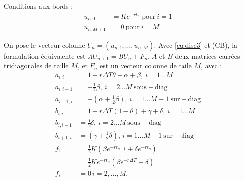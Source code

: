 \documentclass[a4paper, 11pt]{article}
\renewcommand{\(}{\left (}
\renewcommand{\)}{\right )}
\newcommand{\uni}[2]{u_{{#1},{#2}}}
\begin{document}
Conditions aux bords :
\begin{align*}
  \uni{n}{0}   & = Ke^{-rt_n} \mathrm{\ pour\ } i = 1 \\
  \uni{n}{M+1} &= 0 \mathrm{\ pour\ } i = M
\end{align*}

On pose le vecteur colonne $U_n=(\uni{n}{1},\ldots,\uni{n}{M})$. Avec \eqref{eq:disc3} et
(CB), la formulation \'equivalente est $AU_{n+1}=BU_n+F_n$, $A$ et $B$
deux matrices carr\'ees tridiagonales de taille $M$, et $F_n$ est un vecteur colonne
de taile $M$, avec :
\begin{align*}
  a_{i,i}  & = 1+r\Delta T\theta + \alpha + \beta,\ i=1\ldots M \\
  a_{i,i-1} & = -\frac{1}{2} \beta,\ i=2\ldots M\ \mathrm{sous-diag} \\
  a_{i+1,i} & = -\(\alpha + \frac{1}{2} \beta\),\ i=1\ldots M-1\ \mathrm{sur-diag} \\
  b_{i,i}  & = 1-r\Delta T(1-\theta) + \gamma + \delta,\ i=1\ldots M \\
  b_{i,i-1} & = \frac{1}{2} \delta,\ i=2\ldots M\ \mathrm{sous-diag} \\
  b_{i+1,i} & = \(\gamma + \frac{1}{2} \delta\),\ i=1\ldots M-1\
              \mathrm{sur-diag} \\
  f_1 & = \frac{1}{2}K\(\beta e^{-rt_{n+1}} + \delta e^{-rt_n}\) \\
      & = \frac{1}{2}Ke^{-rt_n}\(\beta e^{-r\Delta T} + \delta\) \\
  f_i & = 0 \ i=2,\ldots,M.
\end{align*}
\end{document}
